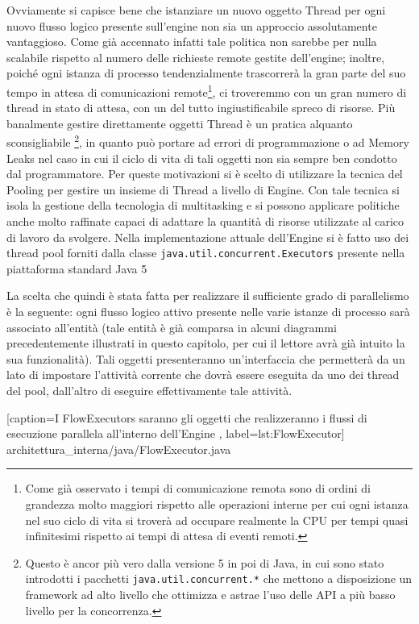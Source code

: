 Ovviamente si capisce bene che istanziare un nuovo oggetto Thread per ogni nuovo
flusso logico presente sull'engine non sia un approccio assolutamente
vantaggioso. Come già accennato infatti tale politica non sarebbe per nulla
scalabile rispetto al numero delle richieste remote gestite dell'engine; inoltre,
poiché ogni istanza di processo tendenzialmente trascorrerà la gran parte del suo
tempo in attesa di comunicazioni remote\footnote{Come già osservato i tempi di
comunicazione remota sono di ordini di grandezza molto maggiori rispetto alle
operazioni interne per cui ogni istanza nel suo ciclo di vita si troverà ad
occupare realmente la CPU per tempi quasi infinitesimi rispetto ai tempi di
attesa di eventi remoti.}, ci troveremmo con un gran numero di thread in stato
di attesa, con un del tutto ingiustificabile spreco di risorse. Più banalmente
gestire direttamente oggetti Thread \`e un pratica alquanto sconsigliabile
\footnote{Questo \`e ancor pi\`u vero dalla versione 5 in poi di Java, in cui
sono stato introdotti i pacchetti \texttt{java.util.concurrent.*} che mettono a
disposizione un framework ad alto livello che ottimizza e astrae l'uso delle API
a più basso livello per la concorrenza.}, in quanto può portare ad errori di
programmazione o ad Memory Leaks nel caso in cui il ciclo di vita di tali oggetti
non sia sempre ben condotto dal programmatore. Per queste motivazioni si \`e
scelto di utilizzare la tecnica del Pooling per gestire un insieme di Thread a
livello di Engine. Con tale tecnica si isola la gestione della tecnologia di
multitasking e si possono applicare politiche anche molto raffinate capaci di
adattare la quantità di risorse utilizzate al carico di lavoro da svolgere. Nella
implementazione attuale dell'Engine si \`e fatto uso dei thread pool forniti
dalla classe \texttt{java.util.concurrent.Executors} presente nella piattaforma
standard Java 5
 
La scelta che quindi \`e stata fatta per realizzare il sufficiente grado di
parallelismo \`e la seguente: ogni flusso logico attivo presente nelle varie istanze di
processo sarà associato all'entità  (tale entità \`e già
comparsa in alcuni diagrammi precedentemente illustrati in questo capitolo, per
cui il lettore avrà già intuito la sua funzionalità). Tali oggetti
presenteranno un'interfaccia che permetterà da un lato di impostare l'attività corrente che
dovrà essere eseguita da uno dei thread del pool, dall'altro di eseguire
effettivamente tale attività.


[caption={I FlowExecutors saranno gli oggetti che realizzeranno i flussi di
esecuzione parallela all'interno dell'Engine }, label=lst:FlowExecutor]
{architettura_interna/java/FlowExecutor.java}

